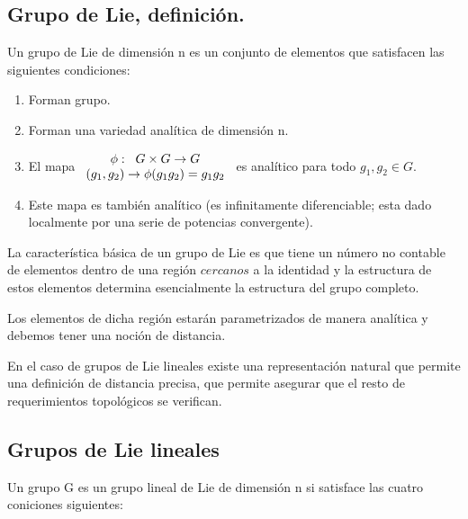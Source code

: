 \documentclass{article}
\begin{document}
 \subsection{Grupo de Lie, definición.}
 
 Un grupo de Lie de dimensión n es un conjunto de elementos que satisfacen las siguientes condiciones:
 
 \begin{enumerate}
     \item Forman grupo.
     \item Forman una variedad analítica de dimensión n.
     \item El mapa $\begin{array}{cc}
         \phi: \hspace{0.2cm} G\times G \to G  \\
          (g_1,g_2)\to \phi (g_1g_2)=g_1g_2
     \end{array}$ es analítico para todo $g_1,g_2 \in G$.
     \item Este mapa es también analítico (es infinitamente diferenciable; esta dado localmente por una serie de potencias convergente).
      \end{enumerate}
      
     La característica básica de un grupo de Lie es que tiene un número no contable de elementos dentro de una región $\textit{cercanos}$ a la identidad y la estructura de estos elementos determina esencialmente la estructura del grupo completo.
     
     \smallskip
     Los elementos de dicha región estarán parametrizados de manera analítica y debemos tener una noción de distancia.
     
     En el caso de grupos de Lie lineales existe una representación natural que permite una definición de distancia precisa, que permite asegurar que el resto de requerimientos topológicos se verifican.
     
     \subsection{Grupos de Lie lineales}
     
     Un grupo G es un grupo lineal de Lie de dimensión n si satisface las cuatro coniciones siguientes:
     
\end{document}
